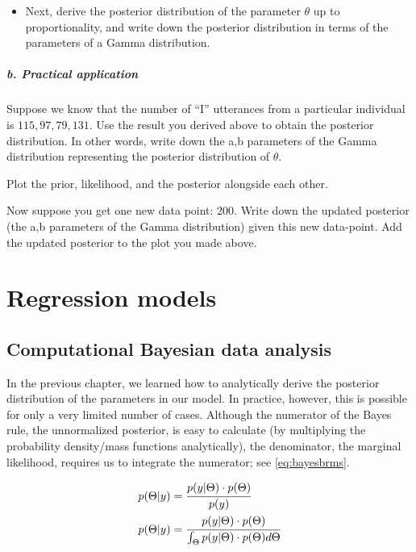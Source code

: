\documentclass[12pt,]{krantz}
\providecommand{\tightlist}{%
  \setlength{\itemsep}{0pt}\setlength{\parskip}{0pt}}
\theoremstyle{definition}
\theoremstyle{definition}
\theoremstyle{definition}
\theoremstyle{remark}
\begin{document}
\begin{itemize}
\tightlist
\item
  Next, derive the posterior distribution of the parameter \(\theta\) up
  to proportionality, and write down the posterior distribution in terms
  of the parameters of a Gamma distribution.
\end{itemize}

\subsubsection{b. Practical application}\label{b.-practical-application}

Suppose we know that the number of ``I'' utterances from a particular
individual is \(115, 97, 79, 131\). Use the result you derived above to
obtain the posterior distribution. In other words, write down the a,b
parameters of the Gamma distribution representing the posterior
distribution of \(\theta\).

Plot the prior, likelihood, and the posterior alongside each other.

Now suppose you get one new data point: 200. Write down the updated
posterior (the a,b parameters of the Gamma distribution) given this new
data-point. Add the updated posterior to the plot you made above.

\part{Regression models}\label{part-regression-models}

\chapter{Computational Bayesian data analysis}\label{ch:compbda}

In the previous chapter, we learned how to analytically derive the
posterior distribution of the parameters in our model. In practice,
however, this is possible for only a very limited number of cases.
Although the numerator of the Bayes rule, the unnormalized posterior, is
easy to calculate (by multiplying the probability density/mass functions
analytically), the denominator, the marginal likelihood, requires us to
integrate the numerator; see \eqref{eq:bayesbrms}.

\begin{equation}
\begin{aligned}
p(\Theta|y) &= \cfrac{ p(y|\Theta) \cdot p(\Theta) }{p(y)}\\
p(\Theta|y) &= \cfrac{ p(y|\Theta) \cdot p(\Theta) }{\int_{\Theta} p(y|\Theta) \cdot p(\Theta) d\Theta }
\end{aligned}
\label{eq:bayesbrms}
\end{equation}
\end{document}
